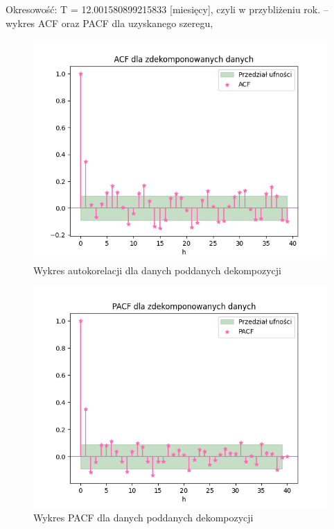 \documentclass[12pt]{article}
\begin{document}
Okresowość: T = 12.001580899215833 [miesięcy], czyli w przybliżeniu rok.
– wykres ACF oraz PACF dla uzyskanego szeregu, 
\begin{figure}[!htbp]
    \centering
    \includegraphics[scale=0.70]{decomposed_acf.png}
    \caption{Wykres autokorelacji dla danych poddanych dekompozycji}
    \label{fig:enter-label}
\end{figure}

\begin{figure}[!htbp]
    \centering
    \includegraphics[scale=0.70]{decomposed_pacf.png}
    \caption{Wykres PACF dla danych poddanych dekompozycji}
    \label{fig:enter-label}
\end{figure}
\\
\end{document}
